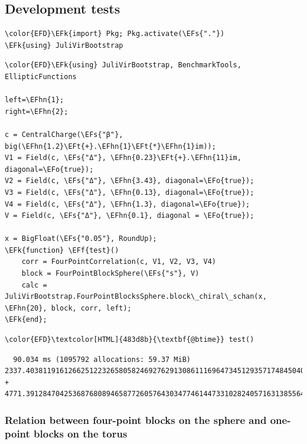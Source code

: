 \documentclass[a4paper]{article}
\numberwithin{equation}{section}
\newcommand{\EFs}[1]{\textcolor{EFs}{#1}} %
\newcommand{\EFk}[1]{\textcolor{EFk}{#1}} %
\newcommand{\EFf}[1]{\textcolor{EFf}{#1}} %
\newcommand{\EFt}[1]{\textcolor{EFt}{#1}} %
\newcommand{\EFo}[1]{\textcolor{EFo}{#1}} %
\newcommand{\EFhn}[1]{\textcolor{EFhn}{#1}} %
\begin{document}
\subsection{Development tests}
\label{sec:orgc0970a2}
\begin{Code}
\begin{Verbatim}
\color{EFD}\EFk{import} Pkg; Pkg.activate(\EFs{"."})
\EFk{using} JuliVirBootstrap
\end{Verbatim}
\end{Code}

\begin{Code}
\begin{Verbatim}
\color{EFD}\EFk{using} JuliVirBootstrap, BenchmarkTools, EllipticFunctions

left=\EFhn{1};
right=\EFhn{2};

c = CentralCharge(\EFs{"β"}, big(\EFhn{1.2}\EFt{+}.\EFhn{1}\EFt{*}\EFhn{1}im));
V1 = Field(c, \EFs{"Δ"}, \EFhn{0.23}\EFt{+}.\EFhn{11}im, diagonal=\EFo{true});
V2 = Field(c, \EFs{"Δ"}, \EFhn{3.43}, diagonal=\EFo{true});
V3 = Field(c, \EFs{"Δ"}, \EFhn{0.13}, diagonal=\EFo{true});
V4 = Field(c, \EFs{"Δ"}, \EFhn{1.3}, diagonal=\EFo{true});
V = Field(c, \EFs{"Δ"}, \EFhn{0.1}, diagonal = \EFo{true});

x = BigFloat(\EFs{"0.05"}, RoundUp);
\EFk{function} \EFf{test}()
    corr = FourPointCorrelation(c, V1, V2, V3, V4)
    block = FourPointBlockSphere(\EFs{"s"}, V)
    calc = JuliVirBootstrap.FourPointBlocksSphere.block\_chiral\_schan(x, \EFhn{20}, block, corr, left);
\EFk{end};
\end{Verbatim}
\end{Code}

\begin{Code}
\begin{Verbatim}
\color{EFD}\textcolor[HTML]{483d8b}{\textbf{@btime}} test()
\end{Verbatim}
\end{Code}

\begin{verbatim}
  90.034 ms (1095792 allocations: 59.37 MiB)
2337.403811916126625122326580582469276291308611169647345129357174845040805086673 + 4771.391284704253687680894658772605764303477461447331028240571631385564211692817im
\end{verbatim}
\subsubsection*{Relation between four-point blocks on the sphere and one-point blocks on the torus}
\label{sec:orgb547a73}
\end{document}
